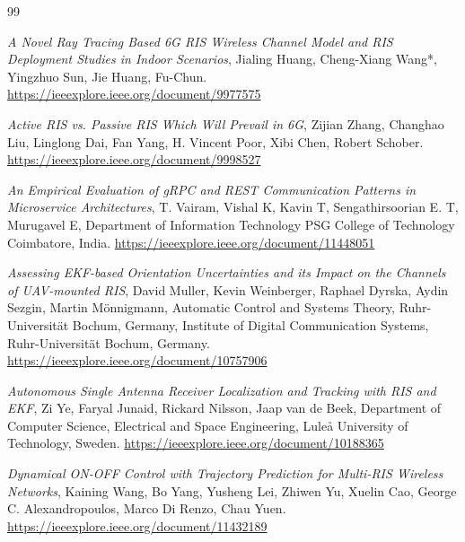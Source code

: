 \documentclass[twoside]{article}
\begin{document}

\newpage

{}


\begin{thebibliography}{99}

\vspace{\baselineskip}

\textit{A Novel Ray Tracing Based 6G RIS Wireless Channel Model and RIS Deployment Studies in Indoor Scenarios}, Jialing Huang, Cheng-Xiang Wang*, Yingzhuo Sun, Jie Huang, Fu-Chun. 
\url{https://ieeexplore.ieee.org/document/9977575}

\textit{Active RIS vs. Passive RIS Which Will Prevail in 6G}, Zijian Zhang, Changhao Liu, Linglong Dai, Fan Yang, H. Vincent Poor, Xibi Chen, Robert Schober. 
\url{https://ieeexplore.ieee.org/document/9998527}

\textit{An Empirical Evaluation of gRPC and REST Communication Patterns in Microservice Architectures}, T. Vairam, Vishal K, Kavin T, Sengathirsoorian E. T, Murugavel E, Department of Information Technology PSG College of Technology Coimbatore, India. 
\url{https://ieeexplore.ieee.org/document/11448051}

\textit{Assessing EKF-based Orientation Uncertainties and its Impact on the Channels of UAV-mounted RIS}, David Muller, Kevin Weinberger, Raphael Dyrska, Aydin Sezgin, Martin Mönnigmann, Automatic Control and Systems Theory, Ruhr-Universität Bochum, Germany, Institute of Digital Communication Systems, Ruhr-Universität Bochum, Germany. 
\url{https://ieeexplore.ieee.org/document/10757906}

\textit{Autonomous Single Antenna Receiver Localization and Tracking with RIS and EKF}, Zi Ye, Faryal Junaid, Rickard Nilsson, Jaap van de Beek, Department of Computer Science, Electrical and Space Engineering, Luleå University of Technology, Sweden. 
\url{https://ieeexplore.ieee.org/document/10188365}

\textit{Dynamical ON-OFF Control with Trajectory Prediction for Multi-RIS Wireless Networks}, Kaining Wang, Bo Yang, Yusheng Lei, Zhiwen Yu, Xuelin Cao, George C. Alexandropoulos, Marco Di Renzo, Chau Yuen. 
\url{https://ieeexplore.ieee.org/document/11432189}


\end{thebibliography}
\end{document}

